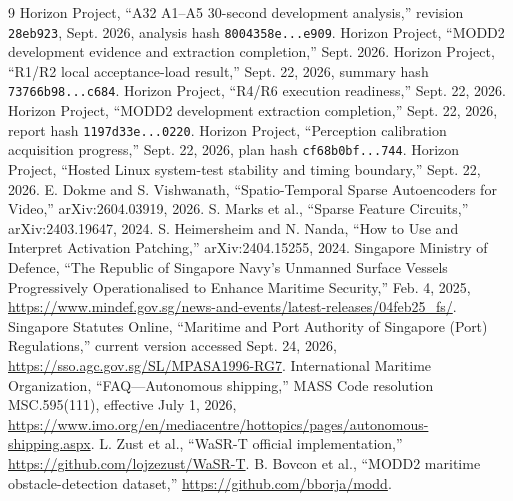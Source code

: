 \documentclass[sigconf,nonacm]{acmart}
\begin{document}
\balance
\begin{thebibliography}{9}
\scriptsize
{} Horizon Project, ``A32 A1--A5 30-second development analysis,'' revision \texttt{28eb923}, Sept. 2026, analysis hash \texttt{8004358e...e909}.
 Horizon Project, ``MODD2 development evidence and extraction completion,'' Sept. 2026.
 Horizon Project, ``R1/R2 local acceptance-load result,'' Sept. 22, 2026, summary hash \texttt{73766b98...c684}.
 Horizon Project, ``R4/R6 execution readiness,'' Sept. 22, 2026.
 Horizon Project, ``MODD2 development extraction completion,'' Sept. 22, 2026, report hash \texttt{1197d33e...0220}.
 Horizon Project, ``Perception calibration acquisition progress,'' Sept. 22, 2026, plan hash \texttt{cf68b0bf...744}.
 Horizon Project, ``Hosted Linux system-test stability and timing boundary,'' Sept. 22, 2026.
 E. Dokme and S. Vishwanath, ``Spatio-Temporal Sparse Autoencoders for Video,'' arXiv:2604.03919, 2026.
 S. Marks et al., ``Sparse Feature Circuits,'' arXiv:2403.19647, 2024.
 S. Heimersheim and N. Nanda, ``How to Use and Interpret Activation Patching,'' arXiv:2404.15255, 2024.
 Singapore Ministry of Defence, ``The Republic of Singapore Navy's Unmanned Surface Vessels Progressively Operationalised to Enhance Maritime Security,'' Feb. 4, 2025, \url{https://www.mindef.gov.sg/news-and-events/latest-releases/04feb25_fs/}.
 Singapore Statutes Online, ``Maritime and Port Authority of Singapore (Port) Regulations,'' current version accessed Sept. 24, 2026, \url{https://sso.agc.gov.sg/SL/MPASA1996-RG7}.
 International Maritime Organization, ``FAQ---Autonomous shipping,'' MASS Code resolution MSC.595(111), effective July 1, 2026, \url{https://www.imo.org/en/mediacentre/hottopics/pages/autonomous-shipping.aspx}.
 L. Zust et al., ``WaSR-T official implementation,'' \url{https://github.com/lojzezust/WaSR-T}.
 B. Bovcon et al., ``MODD2 maritime obstacle-detection dataset,'' \url{https://github.com/bborja/modd}.
\end{thebibliography}
\end{document}
